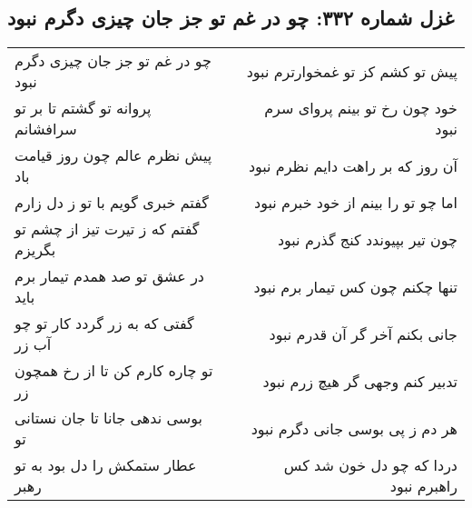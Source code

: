 \begin{center}
\section*{غزل شماره ۳۳۲: چو در غم تو جز جان چیزی دگرم نبود}
\label{sec:332}
\begin{longtable}{l p{0.5cm} r}
چو در غم تو جز جان چیزی دگرم نبود
&&
پیش تو کشم کز تو غمخوارترم نبود
\\
پروانه تو گشتم تا بر تو سرافشانم
&&
خود چون رخ تو بینم پروای سرم نبود
\\
پیش نظرم عالم چون روز قیامت باد
&&
آن روز که بر راهت دایم نظرم نبود
\\
گفتم خبری گویم با تو ز دل زارم
&&
اما چو تو را بینم از خود خبرم نبود
\\
گفتم که ز تیرت تیز از چشم تو بگریزم
&&
چون تیر بپیوندد کنج گذرم نبود
\\
در عشق تو صد همدم تیمار برم باید
&&
تنها چکنم چون کس تیمار برم نبود
\\
گفتی که به زر گردد کار تو چو آب زر
&&
جانی بکنم آخر گر آن قدرم نبود
\\
تو چاره کارم کن تا از رخ همچون زر
&&
تدبیر کنم وجهی گر هیچ زرم نبود
\\
بوسی ندهی جانا تا جان نستانی تو
&&
هر دم ز پی بوسی جانی دگرم نبود
\\
عطار ستمکش را دل بود به تو رهبر
&&
دردا که چو دل خون شد کس راهبرم نبود
\\
\end{longtable}
\end{center}
